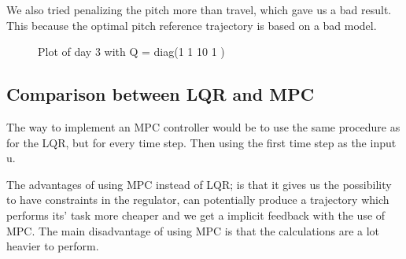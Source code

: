 We also tried penalizing the pitch more than travel, which gave us a bad result. This because the optimal pitch reference trajectory is based on a bad model.
\begin{figure}[htb]
	\centering
	\caption{Plot of day 3 with Q = diag(1 1 10 1 )}
	\label{fig:day3_plot_1_1_10_1}
\end{figure}

\subsection{Comparison between LQR and MPC}
The way to implement an MPC controller would be to use the same procedure as for the LQR, but for every time step. Then using the first time step as the input u.

The advantages of using MPC instead of LQR; is that it gives us the possibility to have constraints in the regulator, can potentially produce a trajectory which performs its' task more cheaper and we get a implicit feedback with the use of MPC.
The main disadvantage of using MPC is that the calculations are a lot heavier to perform.
